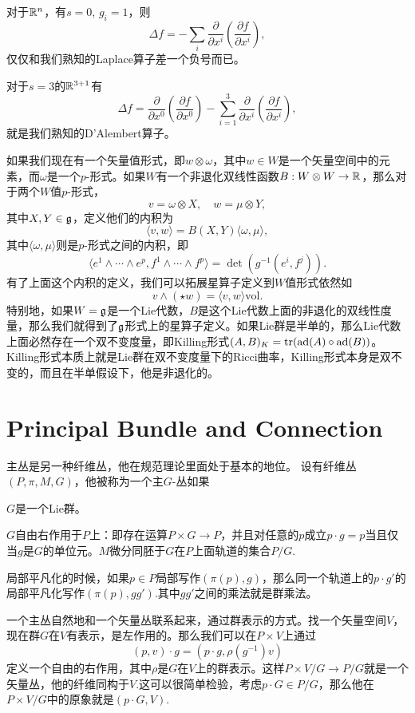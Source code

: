对于$\mathbb{R}^n$，有$s=0$, $g_i=1$，则
\[
	\Delta f=-\sum_i\frac{\partial}{\partial x^i}\left(\frac{\partial f}{\partial x^i}\right),
\]
仅仅和我们熟知的Laplace算子差一个负号而已。

对于$s=3$的$\mathbb{R}^{3+1}$有
\[
	\Delta f=\frac{\partial}{\partial x^0}\left(\frac{\partial f}{\partial x^0}\right)-\sum_{i=1}^3\frac{\partial}{\partial x^i}\left(\frac{\partial f}{\partial x^i}\right),
\]
就是我们熟知的D'Alembert算子。

如果我们现在有一个矢量值形式，即$w\otimes \omega$，其中$w\in W$是一个矢量空间中的元素，而$\omega$是一个$p$-形式。如果$W$有一个非退化双线性函数$B:W\otimes W\to \mathbb{R}$，那么对于两个$W$值$p$-形式，
\[
	v=\omega\otimes X,\quad w=\mu\otimes Y,
\]
其中$X,Y\in \mathfrak{g}$，定义他们的内积为
\[
	\langle v,w\rangle=B(X,Y) \langle\omega,\mu\rangle,
\]
其中$\langle\omega,\mu\rangle$则是$p$-形式之间的内积，即
\[
	\langle e^1\wedge\cdots \wedge e^p,f^1\wedge\cdots \wedge f^p\rangle =\det(g^{-1}(e^i,f^j)).
\]
有了上面这个内积的定义，我们可以拓展星算子定义到$W$值形式依然如
\[
	v\wedge(\star w)=\langle v,w\rangle \mathrm{vol}.
\]
特别地，如果$W=\mathfrak{g}$是一个Lie代数，$B$是这个Lie代数上面的非退化的双线性度量，那么我们就得到了$\mathfrak{g}$形式上的星算子定义。如果Lie群是半单的，那么Lie代数上面必然存在一个双不变度量，即Killing形式$(A,B)_K=\operatorname{tr}(\mathrm{ad}(A)\circ \mathrm{ad}(B))$。Killing形式本质上就是Lie群在双不变度量下的Ricci曲率，Killing形式本身是双不变的，而且在半单假设下，他是非退化的。


\section{Principal Bundle and Connection}
主丛是另一种纤维丛，他在规范理论里面处于基本的地位。
\para 设有纤维丛$(P,\pi,M,G)$，他被称为一个主$G$-丛如果

	 $G$是一个Lie群。

	 $G$自由右作用于$P$上：即存在运算$P\times G\to P$，并且对任意的$p$成立$p\cdot g=p$当且仅当$g$是$G$的单位元。$M$微分同胚于$G$在$P$上面轨道的集合$P/G$.

	 局部平凡化的时候，如果$p\in P$局部写作$(\pi(p),g)$，那么同一个轨道上的$p\cdot g'$的局部平凡化写作$(\pi(p),gg')$.其中$gg'$之间的乘法就是群乘法。


一个主丛自然地和一个矢量丛联系起来，通过群表示的方式。找一个矢量空间$V$，现在群$G$在$V$有表示，是左作用的。那么我们可以在$P\times V$上通过
\[
	(p,v)\cdot g=(p\cdot g,\rho(g^{-1})v)
\]
定义一个自由的右作用，其中$\rho$是$G$在$V$上的群表示。这样$P\times V/G\to P/G$就是一个矢量丛，他的纤维同构于$V$.这可以很简单检验，考虑$p\cdot G\in P/G$，那么他在$P\times V/G$中的原象就是$(p\cdot G,V)$.

